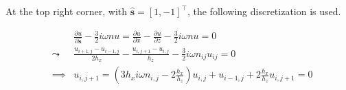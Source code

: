 \documentclass[10pt,a4paper]{article}
\newcommand{\s}{\mathbf{s}}
\begin{document}
At the top right corner, with $\hat{\s}=[1,-1]^\top$, the following discretization is used.

\begin{eqnarray}
&& \frac{\partial u}{\partial \hat{\s}}-\frac{3}{2}i\omega nu= \frac{\partial u}{\partial x}-\frac{\partial u}{\partial z}-\frac{3}{2}i\omega nu=0\\
&\leadsto& \frac{u_{i+1,j}-u_{i-1,j}}{2h_x}-\frac{u_{i,j+1}-u_{i,j}}{h_z}-\frac{3}{2}i\omega n_{ij}u_{ij}=0\\
&\implies& u_{i,j+1} = (3h_xi\omega n_{i,j}-2\frac{h_x}{h_z})u_{i,j}+u_{i-1,j}+2\frac{h_x}{h_z}u_{i,j+1}=0
\end{eqnarray}
\end{document}
